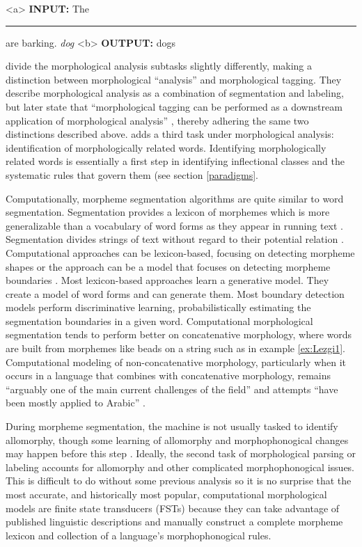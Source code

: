 \documentclass[12pt]{article}
\begin{document}
\begin{singlespace}
\label{ex:ConLL-T2}
\a<a> \textbf{INPUT:}  The \rule{1cm}{0.15mm} are barking.  \hspace{5 mm} \textit{dog}
\label{ex:ConLL-T2a}
\a<b> \textbf{OUTPUT:} dogs
\label{ex:ConLL-T2b}
\xe
\end{singlespace}

 divide the morphological analysis subtasks slightly differently, making a distinction between morphological “analysis” and morphological tagging. They describe morphological analysis as a combination of segmentation and labeling, but later state that ``morphological tagging can be performed as a downstream application of morphological analysis'' , thereby adhering the same two distinctions described above.  adds a third task under morphological analysis: identification of morphologically related words. Identifying morphologically related words is essentially a first step in identifying inflectional classes and the systematic rules that govern them (see section \ref{paradigms}. 

Computationally, morpheme segmentation algorithms are quite similar to word segmentation. Segmentation provides a lexicon of morphemes which is more generalizable than a vocabulary of word forms as they appear in running text \cite{creutz_unsupervised_2002}. Segmentation divides strings of text without regard to their potential relation \cite{virpioja_empirical_2011}. Computational approaches can be lexicon-based, focusing on detecting morpheme shapes or the approach can be a model that focuses on detecting morpheme boundaries \cite{goodman_generation_2013}. Most lexicon-based approaches learn a generative model. They create a model of word forms and can generate them. Most boundary detection models perform discriminative learning, probabilistically estimating the segmentation boundaries in a given word. Computational morphological segmentation tends to perform better on concatenative morphology, where words are built from morphemes like beads on a string such as in example \ref{ex:Lezgi1}. Computational modeling of non-concatenative morphology, particularly when it occurs in a language that combines with concatenative morphology, remains ``arguably one of the main current challenges of the field'' and attempts ``have been mostly applied to Arabic'' \cite{goldsmith_computational_2017}. 

During morpheme segmentation, the machine is not usually tasked to identify allomorphy, though some learning of allomorphy and morphophonogical changes may happen before this step \cite{goldsmith_computational_2017}. Ideally, the second task of morphological parsing or labeling accounts for allomorphy and other complicated morphophonogical issues. This is difficult to do without some previous analysis so it is no surprise that the most accurate, and historically most popular, computational morphological models are finite state transducers (FSTs) because they can take advantage of published linguistic descriptions and manually construct a complete morpheme lexicon and collection of a language's morphophonogical rules. 
\end{document}
